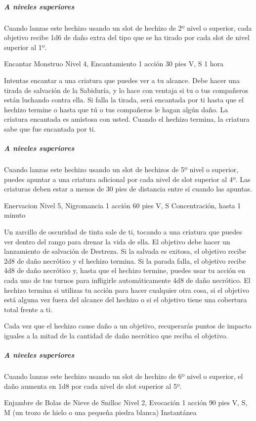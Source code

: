 \documentclass[a4paper,twocolumn,openany,10pt]{dndbook}
\begin{document}
	\subparagraph{A niveles superiores} Cuando lanzas este hechizo usando un slot de hechizo de 2º nivel o superior, cada
	objetivo recibe 1d6 de daño extra del tipo que se ha tirado por cada slot de nivel superior al 1º.

\spellheader%
	{Encantar Monstruo}
	{Nivel 4, Encantamiento}
	{1 acción}
	{30 pies}
	{V, S}
	{1 hora}
	
	Intentas encantar a una criatura que puedes ver a tu alcance. Debe hacer una tirada de salvación de la Sabiduría, y lo hace
	con ventaja si tu o tus compañeros están luchando contra ella. Si falla la tirada, será encantada por ti hasta que el
	hechizo termine o hasta que tú o tus compañeros le hagan algún daño. La criatura encantada es amistosa con usted. Cuando el
	hechizo termina, la criatura sabe que fue encantada por ti.

	\subparagraph{A niveles superiores} Cuando lanzas este hechizo usando un slot de hechizos de 5º nivel o superior, puedes
	apuntar a una criatura adicional por cada nivel de slot superior al 4º. Las criaturas deben estar a menos de 30 pies de
	distancia entre sí cuando las apuntas. 

\spellheader%
	{Enervacion}
	{Nivel 5, Nigromancia}
	{1 acción}
	{60 pies}
	{V, S}
	{Concentración, hasta 1 minuto}
	
	Un zarcillo de oscuridad de tinta sale de ti, tocando a una criatura que puedes ver dentro del rango para drenar la vida de
	ella. El objetivo debe hacer un lanzamiento de salvación de Destreza. Si la salvada es exitosa, el objetivo recibe 2d8 de
	daño necrótico y el hechizo termina. Si la parada falla, el objetivo recibe 4d8 de daño necrótico y, hasta que el hechizo
	termine, puedes usar tu acción en cada uno de tus turnos para infligirle automáticamente 4d8 de daño necrótico. El hechizo
	termina si utilizas tu acción para hacer cualquier otra cosa, si el objetivo está alguna vez fuera del alcance del hechizo o
	si el objetivo tiene una cobertura total frente a ti.
	
	Cada vez que el hechizo cause daño a un objetivo, recuperarás puntos de impacto iguales a la mitad de la cantidad de daño
	necrótico que reciba el objetivo.

	\subparagraph{A niveles superiores} Cuando lanzas este hechizo usando un slot de hechizo de 6º nivel o superior, el daño
	aumenta en 1d8 por cada nivel de slot superior al 5º. 

\spellheader%
	{Enjambre de Bolas de Nieve de Snilloc}
	{Nivel 2, Evocación}
	{1 acción}
	{90 pies}
	{V, S, M (un trozo de hielo o una pequeña piedra blanca)}
	{Instantánea}
	
\end{document}
